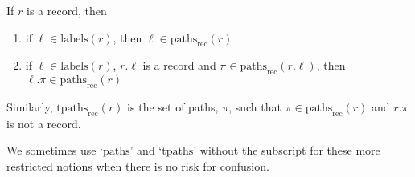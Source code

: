 If $r$ is a record, then
\begin{enumerate} 
 
\item if $\ell\in\mathrm{labels}(r)$, then $\ell\in\mathrm{paths}_{\text{rec}}(r)$ 
 
\item if $\ell\in\mathrm{labels}(r)$, $r.\ell$ is a record and
  $\pi\in\mathrm{paths}_{\text{rec}}(r.\ell)$, then $\ell.\pi\in\mathrm{paths}_{\text{rec}}(r)$
\end{enumerate}  

Similarly, $\mathrm{tpaths}_{\text{rec}}(r)$ is the set of paths,
$\pi$, such that $\pi\in\mathrm{paths}_{\text{rec}}(r)$ and $r.\pi$ is
not a record.

We sometimes use `$\mathrm{paths}$' and `$\mathrm{tpaths}$' without the subscript for these
more restricted notions when there is no risk for confusion.

